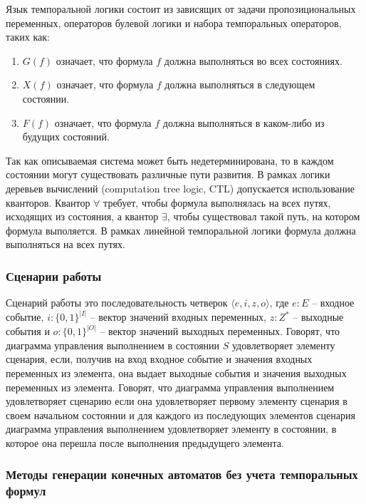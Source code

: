 \documentclass[14pt]{extarticle}
\theoremstyle{plain}
\theoremstyle{definition}
\begin{document}
Язык темпоральной логики состоит из зависящих от задачи
пропозициональных переменных, операторов булевой логики и набора темпоральных
операторов, таких как:

\begin{enumerate}
    \item $G(f)$ означает, что формула $f$ должна выполняться во всех состояниях.
    \item $X(f)$ означает, что формула $f$ должна выполняться в следующем состоянии.
    \item $F(f)$ означает, что формула $f$ должна выполняться в каком-либо из будущих состояний.
\end{enumerate}

Так как описываемая система может быть недетерминирована, то в каждом
состоянии могут существовать различные пути развития. В рамках логики
деревьев вычислений (computation tree logic, CTL) допускается использование кванторов. Квантор $\forall$
требует, чтобы формула выполнялась на всех путях, исходящих из состояния, а
квантор $\exists$, чтобы существовал такой путь, на котором формула выполяется.
В рамках линейной темпоральной логики формула должна выполняться на всех путях.

\subsubsection{Сценарии работы}

Сценарий работы это последовательность четверок $\langle e, i, z, o
\rangle$, где $e : E$ -- входное событие, $i : \{0, 1\}^{|I|}$ -- вектор
значений входных переменных, $z : Z^*$ -- выходные события и $o :
\{0, 1\}^{|O|}$ -- вектор значений выходных переменных. Говорят, что диаграмма
управления выполнением в состоянии $S$ удовлетворяет элементу сценария, если, получив на вход
входное событие и значения входных переменных из элемента, она выдает выходные события и значения
выходных переменных из элемента. Говорят, что диаграмма управления выполнением удовлетворяет
сценарию если она удовлетворяет первому элементу сценария в своем начальном состоянии и для каждого
из последующих элементов сценария диаграмма управления выполнением удовлетворяет элементу в состоянии,
в которое она перешла после выполнения предыдущего элемента. 

\subsubsection{Методы генерации конечных автоматов без учета темпоральных формул}
\end{document}
